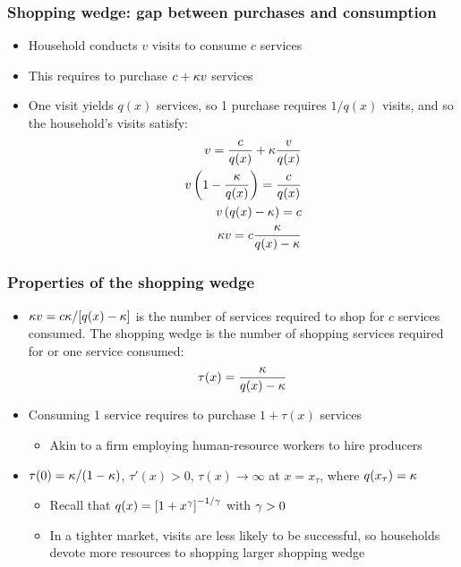 \documentclass[11pt,aspectratio=169,xcolor={dvipsnames},hyperref={pdftex,pdfpagemode=UseNone,hidelinks,pdfdisplaydoctitle=true},usepdftitle=false]{beamer}
\begin{document}
\begin{frame}
\frametitle{Shopping wedge: gap between purchases and consumption}
\begin{itemize}
\item Household conducts $v$ visits to consume $c$ services
\item This requires to purchase $c + \kappa v$ services
\item One visit yields $q(x)$ services, so 1 purchase requires $1/q(x)$ visits, and so the household's visits satisfy:
\begin{align*}
v = \frac{c}{q(x)} + \kappa\frac{v}{q(x)}\\
v \left( 1- \frac{\kappa}{q(x)} \right) = \frac{c}{q(x)}\\
v \left( q(x)- \kappa \right) = c\\
\kappa v = c \frac{\kappa}{q(x)-\kappa}
\end{align*}
\end{itemize}	
\end{frame}

\begin{frame}
\frametitle{Properties of the shopping wedge}
\begin{itemize}
\item $\kappa v = c \kappa/ [q(x)-\kappa]$ is the number of services required to shop for $c$ services consumed. The shopping wedge is the number of shopping services required for or one service consumed:
\begin{equation*}
\tau(x) = \frac{\kappa}{q(x)-\kappa}
\end{equation*}
\item Consuming 1 service requires to purchase $1 + \tau(x)$ services
\begin{itemize}
	\item Akin to a firm employing human-resource workers to hire producers
\end{itemize}
\item $\tau(0)=\kappa/(1-\kappa)$, $\tau'(x)>0$, $\tau(x)\to \infty$ at $x = x_{\tau}$, where $q(x_{\tau}) = \kappa$
\begin{itemize}
	\item Recall that $q(x) = \left[ 1+ x^{\gamma} \right]^{-1/\gamma}$ with $\gamma>0$
	\item In a tighter market, visits are less likely to be successful, so households devote more resources to shopping \then larger shopping wedge
\end{itemize}
\end{itemize}	
\end{frame}
\end{document}
